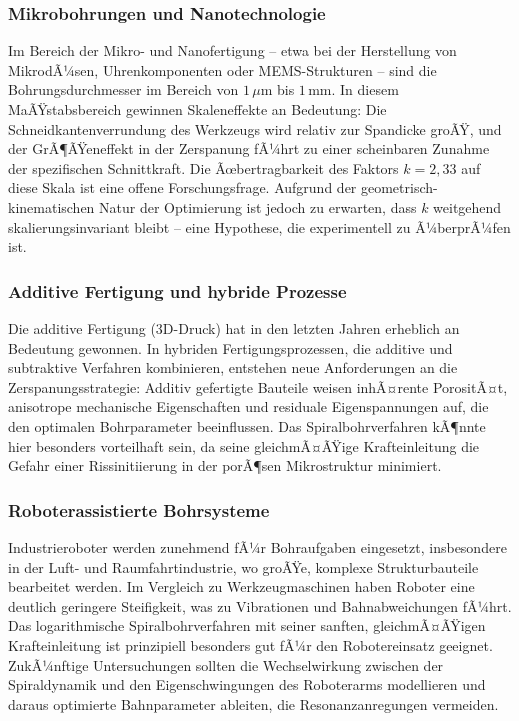 ﻿\documentclass[12pt,a4paper]{article}
\begin{document}
\subsubsection{Mikrobohrungen und Nanotechnologie}

Im Bereich der Mikro- und Nanofertigung -- etwa bei der Herstellung von MikrodÃ¼sen, Uhrenkomponenten oder MEMS-Strukturen -- sind die Bohrungsdurchmesser im Bereich von $1\,\mu\text{m}$ bis $1\,\text{mm}$. In diesem MaÃŸstabsbereich gewinnen Skaleneffekte an Bedeutung: Die Schneidkantenverrundung des Werkzeugs wird relativ zur Spandicke groÃŸ, und der GrÃ¶ÃŸeneffekt in der Zerspanung fÃ¼hrt zu einer scheinbaren Zunahme der spezifischen Schnittkraft. Die Ãœbertragbarkeit des Faktors $k = 2{,}33$ auf diese Skala ist eine offene Forschungsfrage. Aufgrund der geometrisch-kinematischen Natur der Optimierung ist jedoch zu erwarten, dass $k$ weitgehend skalierungsinvariant bleibt -- eine Hypothese, die experimentell zu Ã¼berprÃ¼fen ist.

\subsubsection{Additive Fertigung und hybride Prozesse}

Die additive Fertigung (3D-Druck) hat in den letzten Jahren erheblich an Bedeutung gewonnen. In hybriden Fertigungsprozessen, die additive und subtraktive Verfahren kombinieren, entstehen neue Anforderungen an die Zerspanungsstrategie: Additiv gefertigte Bauteile weisen inhÃ¤rente PorositÃ¤t, anisotrope mechanische Eigenschaften und residuale Eigenspannungen auf, die den optimalen Bohrparameter beeinflussen. Das Spiralbohrverfahren kÃ¶nnte hier besonders vorteilhaft sein, da seine gleichmÃ¤ÃŸige Krafteinleitung die Gefahr einer Rissinitiierung in der porÃ¶sen Mikrostruktur minimiert.

\subsubsection{Roboterassistierte Bohrsysteme}

Industrieroboter werden zunehmend fÃ¼r Bohraufgaben eingesetzt, insbesondere in der Luft- und Raumfahrtindustrie, wo groÃŸe, komplexe Strukturbauteile bearbeitet werden. Im Vergleich zu Werkzeugmaschinen haben Roboter eine deutlich geringere Steifigkeit, was zu Vibrationen und Bahnabweichungen fÃ¼hrt. Das logarithmische Spiralbohrverfahren mit seiner sanften, gleichmÃ¤ÃŸigen Krafteinleitung ist prinzipiell besonders gut fÃ¼r den Robotereinsatz geeignet. ZukÃ¼nftige Untersuchungen sollten die Wechselwirkung zwischen der Spiraldynamik und den Eigenschwingungen des Roboterarms modellieren und daraus optimierte Bahnparameter ableiten, die Resonanzanregungen vermeiden.
\end{document}
